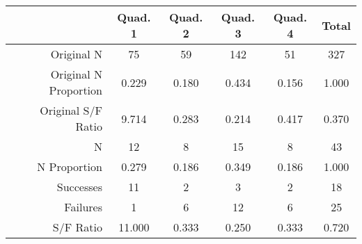 \begin{tabular}{r|ccccc}
\toprule
                      & Quad. 1 & Quad. 2 & Quad. 3 & Quad. 4 & Total \\ \hline
           Original N &      75 &      59 &     142 &      51 &   327 \\
Original N Proportion &   0.229 &   0.180 &   0.434 &   0.156 & 1.000 \\
   Original S/F Ratio &   9.714 &   0.283 &   0.214 &   0.417 & 0.370 \\
                    N &      12 &       8 &      15 &       8 &    43 \\
         N Proportion &   0.279 &   0.186 &   0.349 &   0.186 & 1.000 \\
            Successes &      11 &       2 &       3 &       2 &    18 \\
             Failures &       1 &       6 &      12 &       6 &    25 \\
            S/F Ratio &  11.000 &   0.333 &   0.250 &   0.333 & 0.720 \\
\bottomrule
\end{tabular}
